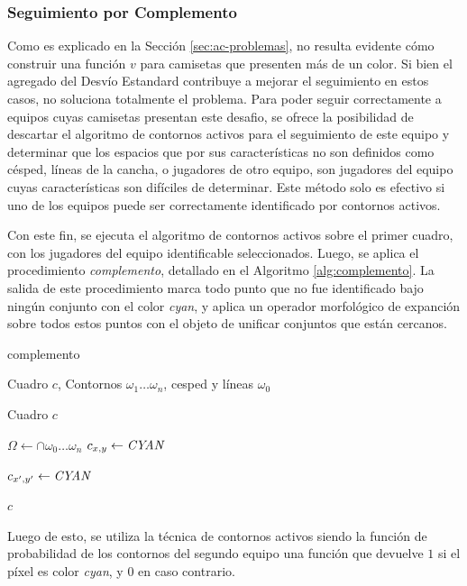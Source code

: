 \subsubsection{Seguimiento por Complemento}

Como es explicado en la Sección \ref{sec:ac-problemas}, no resulta evidente
cómo construir una función $v$ para camisetas que presenten más de un color. Si
bien el agregado del Desvío Estandard contribuye a mejorar el seguimiento en %
estos casos, no soluciona totalmente el problema. Para poder seguir
correctamente a equipos cuyas camisetas presentan este desafio, se ofrece la
posibilidad de descartar el algoritmo de contornos activos para el seguimiento
de este equipo y determinar que los espacios que por sus características no son
definidos como césped, líneas de la cancha, o jugadores de otro equipo, son
jugadores del equipo cuyas características son difíciles de determinar. Este
método solo es efectivo si uno de los equipos puede ser correctamente
identificado por contornos activos.

Con este fin, se ejecuta el algoritmo de contornos activos sobre el primer
cuadro, con los jugadores del equipo identificable seleccionados. Luego, se
aplica el procedimiento \textit{complemento}, detallado en el Algoritmo
\ref{alg:complemento}. La salida de este procedimiento marca todo punto que no
fue identificado bajo ningún conjunto con el color \textit{cyan}, y aplica un
operador morfológico de expanción sobre todos estos puntos con el objeto
de unificar conjuntos que están cercanos.

\begin{algorithm}
    \caption{complemento}
    \label{alg:complemento}
    \begin{algorithmic}
    \Require\hspace{\algorithmicindent}\hspace{\algorithmicindent}Cuadro $c$, Contornos $\omega_1 \dots \omega_n$,
    cesped y líneas $\omega_0$

    \Ensure\hspace{\algorithmicindent}\hspace{0.23cm} Cuadro $c$
    \State

    \State $\Omega \gets \cap{\omega_0 \dots \omega_n}$
            \State $c_{x, y} \gets \text{\textit{CYAN}}$

                \State $c_{x', y'} \gets \text{\textit{CYAN}}$
            \EndFor
        \EndIf
    \EndFor

    \State \Return $c$
    \end{algorithmic}
\end{algorithm}

Luego de esto, se utiliza la técnica de contornos activos siendo la función de
probabilidad de los contornos del segundo equipo una función que devuelve $1$
si el píxel es color \textit{cyan}, y $0$ en caso contrario.


